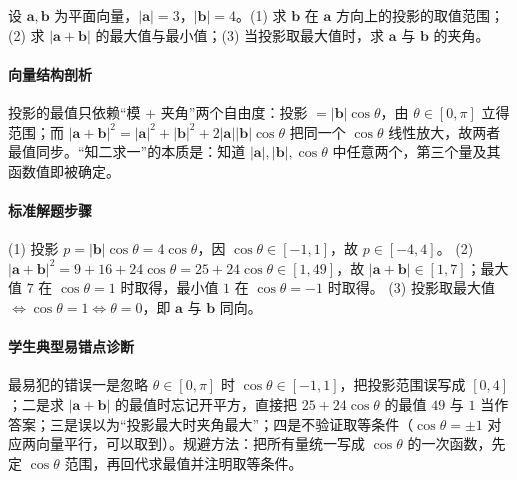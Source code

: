 \begin{problem}
设 $\bm a,\bm b$ 为平面向量，$|\bm a|=3$，$|\bm b|=4$。(1) 求 $\bm b$ 在 $\bm a$ 方向上的投影的取值范围；(2) 求 $|\bm a+\bm b|$ 的最大值与最小值；(3) 当投影取最大值时，求 $\bm a$ 与 $\bm b$ 的夹角。
\end{problem}
\begin{solution}
\paragraph{向量结构剖析}
投影的最值只依赖“模 + 夹角”两个自由度：投影 $=|\bm b|\cos\theta$，由 $\theta\in[0,\pi]$ 立得范围；而 $|\bm a+\bm b|^2=|\bm a|^2+|\bm b|^2+2|\bm a||\bm b|\cos\theta$ 把同一个 $\cos\theta$ 线性放大，故两者最值同步。“知二求一”的本质是：知道 $|\bm a|,|\bm b|,\cos\theta$ 中任意两个，第三个量及其函数值即被确定。
\paragraph{标准解题步骤}
(1) 投影 $p=|\bm b|\cos\theta=4\cos\theta$，因 $\cos\theta\in[-1,1]$，故 $p\in[-4,4]$。
(2) $|\bm a+\bm b|^2=9+16+24\cos\theta=25+24\cos\theta\in[1,49]$，故 $|\bm a+\bm b|\in[1,7]$；最大值 $7$ 在 $\cos\theta=1$ 时取得，最小值 $1$ 在 $\cos\theta=-1$ 时取得。
(3) 投影取最大值 $\iff\cos\theta=1\iff\theta=0$，即 $\bm a$ 与 $\bm b$ 同向。
\paragraph{学生典型易错点诊断}
最易犯的错误一是忽略 $\theta\in[0,\pi]$ 时 $\cos\theta\in[-1,1]$，把投影范围误写成 $[0,4]$；二是求 $|\bm a+\bm b|$ 的最值时忘记开平方，直接把 $25+24\cos\theta$ 的最值 $49$ 与 $1$ 当作答案；三是误以为“投影最大时夹角最大”；四是不验证取等条件（$\cos\theta=\pm1$ 对应两向量平行，可以取到）。规避方法：把所有量统一写成 $\cos\theta$ 的一次函数，先定 $\cos\theta$ 范围，再回代求最值并注明取等条件。
\end{solution}

